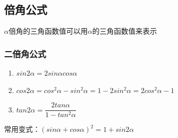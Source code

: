 \subsection*{倍角公式}
$\alpha$倍角的三角函数值可以用$\alpha$的三角函数值来表示
\subsubsection*{二倍角公式} 
\begin{enumerate}
    \item $sin2\alpha = 2sin\alpha cos\alpha$
    \item $cos2\alpha = cos^2\alpha - sin^2\alpha = 1 - 2sin^2\alpha = 2cos^2\alpha - 1$
    \item $tan2\alpha = \dfrac{2tan\alpha}{1-tan^2\alpha}$
\end{enumerate}
常用变式：$(sin\alpha + cos\alpha)^2 = 1 + sin2\alpha$
